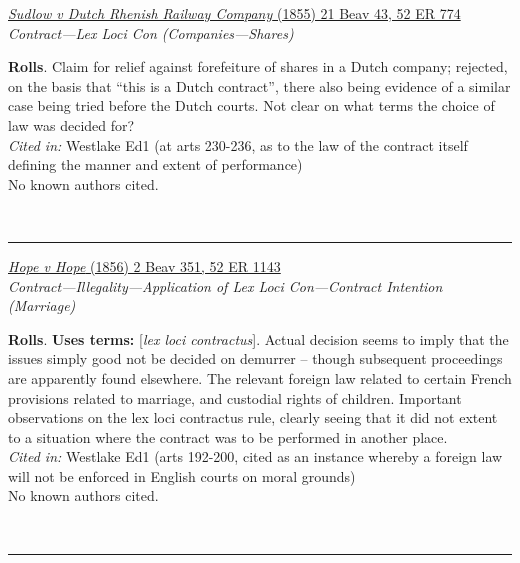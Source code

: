 \documentclass[twoside]{article}
\begin{document}
        \begin{small}
        \begin{center}
        \href{https://heinonline.org/HOL/P?h=hein.engrep/engrd0052&i=782}{\textit{Sudlow v Dutch Rhenish Railway Company} (1855) 21 Beav 43, 52 ER 774} \label{112} \\ 
\textit{Contract---Lex Loci Con (Companies---Shares)}\\
        \end{center}
        \textbf{Rolls}. Claim for relief against forefeiture of shares in a Dutch company; rejected, on the basis that “this is a Dutch contract”, there also being evidence of a similar case being tried before the Dutch courts. Not clear on what terms the choice of law was decided for?\\\textit{Cited in: }Westlake Ed1 (at arts 230-236, as to the law of the contract itself defining the manner and extent of performance)\\No known authors cited.
        \end{small}\\
        \rule{\textwidth}{0.5pt}
        

        \begin{small}
        \begin{center}
        \href{https://heinonline.org/HOL/P?h=hein.engrep/engrd0052&i=1151}{\textit{Hope v Hope} (1856) 2 Beav 351, 52 ER 1143} \label{90} \\ 
\textit{Contract---Illegality---Application of Lex Loci Con---Contract Intention (Marriage)}\\
        \end{center}
        \textbf{Rolls}.  \textbf{Uses terms: }[\textit{lex loci contractus}]. Actual decision seems to imply that the issues simply good not be decided on demurrer – though subsequent proceedings are apparently found elsewhere. The relevant foreign law related to certain French provisions related to marriage, and custodial rights of children. Important observations on the lex loci contractus rule, clearly seeing that it did not extent to a situation where the contract was to be performed in another place.\\\textit{Cited in: }Westlake Ed1 (arts 192-200, cited as an instance whereby a foreign law will not be enforced in English courts on moral grounds)\\No known authors cited.
        \end{small}\\
        \rule{\textwidth}{0.5pt}
        
\end{document}
